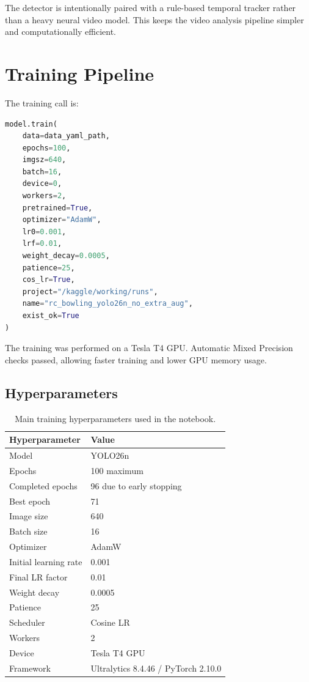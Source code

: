 \documentclass[12pt,a4paper]{article}
\begin{document}
The detector is intentionally paired with a rule-based temporal tracker rather than a heavy neural video model. This keeps the video analysis pipeline simpler and computationally efficient.

\section{Training Pipeline}

The training call is:
\begin{lstlisting}[language=Python]
model.train(
    data=data_yaml_path,
    epochs=100,
    imgsz=640,
    batch=16,
    device=0,
    workers=2,
    pretrained=True,
    optimizer="AdamW",
    lr0=0.001,
    lrf=0.01,
    weight_decay=0.0005,
    patience=25,
    cos_lr=True,
    project="/kaggle/working/runs",
    name="rc_bowling_yolo26n_no_extra_aug",
    exist_ok=True
)
\end{lstlisting}

The training was performed on a Tesla T4 GPU. Automatic Mixed Precision checks passed, allowing faster training and lower GPU memory usage.

\subsection{Hyperparameters}

\begin{table}[H]
\centering
\caption{Main training hyperparameters used in the notebook.}
\label{tab:hyperparameters}
\begin{tabular}{ll}
\toprule
\textbf{Hyperparameter} & \textbf{Value} \\
\midrule
Model & YOLO26n \\
Epochs & 100 maximum \\
Completed epochs & 96 due to early stopping \\
Best epoch & 71 \\
Image size & 640 \\
Batch size & 16 \\
Optimizer & AdamW \\
Initial learning rate & 0.001 \\
Final LR factor & 0.01 \\
Weight decay & 0.0005 \\
Patience & 25 \\
Scheduler & Cosine LR \\
Workers & 2 \\
Device & Tesla T4 GPU \\
Framework & Ultralytics 8.4.46 / PyTorch 2.10.0 \\
\bottomrule
\end{tabular}
\end{table}
\end{document}
